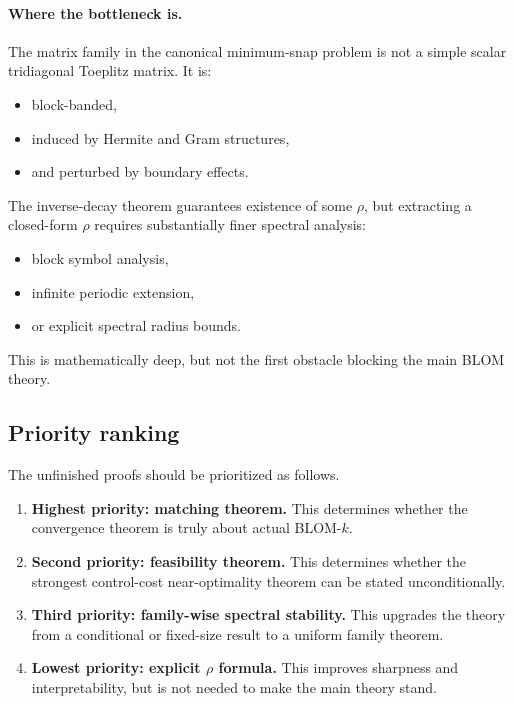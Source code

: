 \paragraph{Where the bottleneck is.}
The matrix family in the canonical minimum-snap problem is not a simple scalar tridiagonal Toeplitz matrix.
It is:
\begin{itemize}
	\item block-banded,
	\item induced by Hermite and Gram structures,
	\item and perturbed by boundary effects.
\end{itemize}
The inverse-decay theorem guarantees existence of some \(\rho\), but extracting a closed-form \(\rho\) requires substantially finer spectral analysis:
\begin{itemize}
	\item block symbol analysis,
	\item infinite periodic extension,
	\item or explicit spectral radius bounds.
\end{itemize}
This is mathematically deep, but not the first obstacle blocking the main BLOM theory.

\subsection{Priority ranking}
\label{subsec:unfinished_priority}

The unfinished proofs should be prioritized as follows.

\begin{enumerate}
	\item \textbf{Highest priority: matching theorem.}
	This determines whether the convergence theorem is truly about actual BLOM-\(k\).
	
	\item \textbf{Second priority: feasibility theorem.}
	This determines whether the strongest control-cost near-optimality theorem can be stated unconditionally.
	
	\item \textbf{Third priority: family-wise spectral stability.}
	This upgrades the theory from a conditional or fixed-size result to a uniform family theorem.
	
	\item \textbf{Lowest priority: explicit \(\rho\) formula.}
	This improves sharpness and interpretability, but is not needed to make the main theory stand.
\end{enumerate}

